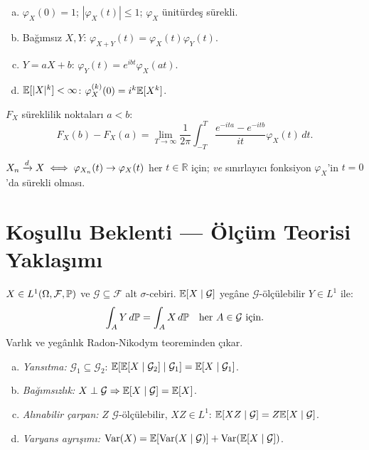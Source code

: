\begin{teorem}[KF özellikleri]\label{app:thm:kf_ozell}
\begin{enumerate}[(a)]
  \item $\varphi_X(0)=1$; $|\varphi_X(t)|\leq1$; $\varphi_X$ ünitürdeş sürekli.
  \item Bağımsız $X,Y$: $\varphi_{X+Y}(t)=\varphi_X(t)\varphi_Y(t)$.
  \item $Y=aX+b$: $\varphi_Y(t)=e^{ibt}\varphi_X(at)$.
  \item $\mathbb{E}[|X|^k]<\infty$: $\varphi_X^{(k)}(0)=i^k\mathbb{E}[X^k]$.
\end{enumerate}
\end{teorem}

\begin{teorem}\label{app:thm:tersim}
$F_X$ süreklilik noktaları $a<b$:
\[
  F_X(b)-F_X(a) = \lim_{T\to\infty}\frac{1}{2\pi}\int_{-T}^T\frac{e^{-ita}-e^{-itb}}{it}\varphi_X(t)\,dt.
\]
\end{teorem}

\begin{teorem}\label{app:thm:levy_sureklilk}
$X_n\xrightarrow{d} X \iff \varphi_{X_n}(t)\to\varphi_X(t)$ her $t\in\mathbb{R}$ için; \textit{ve} sınırlayıcı fonksiyon $\varphi_X$'in $t=0$'da sürekli olması.
\end{teorem}

\section{Koşullu Beklenti — Ölçüm Teorisi Yaklaşımı}
\label{app:kosullu_beklenti}

\begin{tanim}\label{app:def:kosullu_beklenti}
$X\in L^1(\Omega,\mathcal{F},\mathbb{P})$ ve $\mathcal{G}\subseteq\mathcal{F}$ alt $\sigma$-cebiri. $\mathbb{E}[X\mid\mathcal{G}]$ yegâne $\mathcal{G}$-ölçülebilir $Y\in L^1$ ile:
\[
  \int_A Y\,d\mathbb{P} = \int_A X\,d\mathbb{P} \quad \text{her } A\in\mathcal{G} \text{ için.}
\]
Varlık ve yegânlık Radon-Nikodym teoreminden çıkar.
\end{tanim}

\begin{teorem}\label{app:thm:kb_ozell}
\begin{enumerate}[(a)]
  \item \emph{Yansıtma:} $\mathcal{G}_1\subseteq\mathcal{G}_2$: $\mathbb{E}[\mathbb{E}[X\mid\mathcal{G}_2]\mid\mathcal{G}_1]=\mathbb{E}[X\mid\mathcal{G}_1]$.
  \item \emph{Bağımsızlık:} $X\perp\mathcal{G}\Rightarrow\mathbb{E}[X\mid\mathcal{G}]=\mathbb{E}[X]$.
  \item \emph{Alınabilir çarpan:} $Z$ $\mathcal{G}$-ölçülebilir, $XZ\in L^1$: $\mathbb{E}[XZ\mid\mathcal{G}]=Z\mathbb{E}[X\mid\mathcal{G}]$.
  \item \emph{Varyans ayrışımı:} $\operatorname{Var}(X)=\mathbb{E}[\operatorname{Var}(X\mid\mathcal{G})]+\operatorname{Var}(\mathbb{E}[X\mid\mathcal{G}])$.
\end{enumerate}
\end{teorem}

